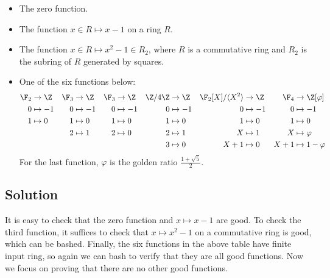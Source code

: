 \begin{itemize}

    \item
    The zero function.
    
    \item
    The function $x \in R \mapsto x - 1$ on a ring $R$.

    \item
    The function $x \in R \mapsto x^2 - 1 \in R_2$, where $R$ is a commutative ring and $R_2$ is the subring of $R$ generated by squares.
    
    \item
    One of the six functions below:
    \begin{align*}
        \F_2 &\to \Z    & \F_3 &\to \Z    & \F_3 &\to \Z    & \Z/4\Z &\to \Z  & \F_2[X]/\langle X^2 \rangle &\to \Z   & \F_4 &\to \Z[\varphi] \\
        0 &\mapsto -1   & 0 &\mapsto -1   & 0 &\mapsto -1   & 0 &\mapsto -1   & 0 &\mapsto -1                         & 0 &\mapsto -1 \\
        1 &\mapsto 0    & 1 &\mapsto 0    & 1 &\mapsto 0    & 1 &\mapsto 0    & 1 &\mapsto 0                          & 1 &\mapsto 0  \\
                       && 2 &\mapsto 1    & 2 &\mapsto 0    & 2 &\mapsto 1    & X &\mapsto 1                          & X &\mapsto \varphi  \\
                                                       &&&&&& 3 &\mapsto 0    & X + 1 &\mapsto 0                      & X + 1 &\mapsto 1 - \varphi
    \end{align*}
    For the last function, $\varphi$ is the golden ratio $\frac{1 + \sqrt{5}}{2}$.

\end{itemize}









\subsection*{Solution}

It is easy to check that the zero function and $x \mapsto x - 1$ are good.
To check the third function, it suffices to check that $x \mapsto x^2 - 1$ on a commutative ring is good, which can be bashed.
Finally, the six functions in the above table have finite input ring, so again we can bash to verify that they are all good functions.
Now we focus on proving that there are no other good functions.

